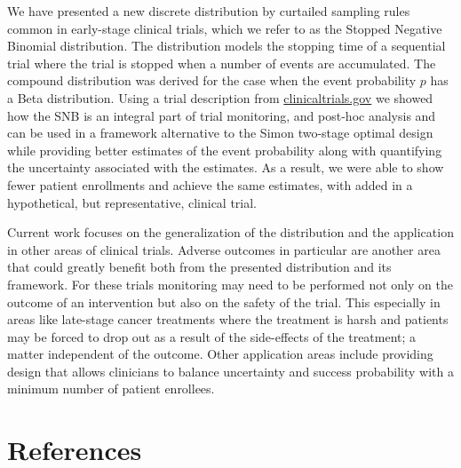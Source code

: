 \documentclass[12pt]{article}         %
\begin{document}
We have presented a new discrete distribution by curtailed sampling rules common in early-stage clinical trials, which we refer to as the Stopped Negative Binomial distribution. The distribution models the stopping time of a sequential trial where the trial is stopped when a number of events are accumulated. The compound distribution was derived for the case when the event probability $p$ has a Beta distribution. Using a trial description from \url{clinicaltrials.gov} we showed how the SNB is an integral part of trial monitoring, and post-hoc analysis and can be used in a framework alternative to the Simon two-stage optimal design while providing better estimates of the event probability along with quantifying the uncertainty associated with the estimates. As a result, we were able to show fewer patient enrollments and achieve the same estimates, with added  in a hypothetical, but representative, clinical trial.

Current work focuses on the generalization of the distribution and the application in other areas of clinical trials. Adverse outcomes in particular are another area that could greatly benefit both from the presented distribution and its framework. For these trials monitoring may need to be performed not only on the outcome of an intervention but also on the safety of the trial. This especially in areas like late-stage cancer treatments where the treatment is harsh and patients may be forced to drop out as a result of the side-effects of the treatment; a matter independent of the outcome. Other application areas include providing design that allows clinicians to balance uncertainty and success probability with a minimum number of patient enrollees.



\section*     {\bf References}
\end{document}
